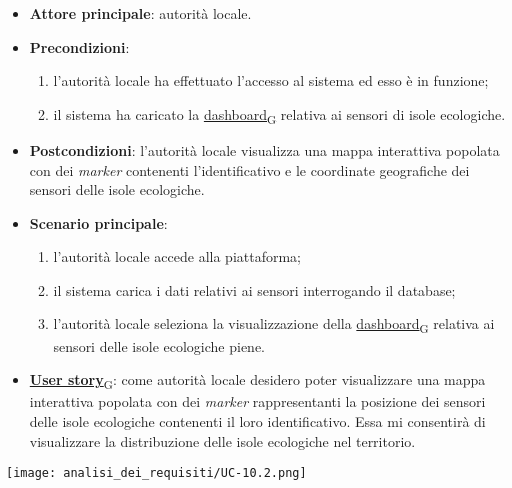 \begin{itemize}
	\item \textbf{Attore principale}: autorità locale.
	\item \textbf{Precondizioni}:
	      \begin{enumerate}
		      \item l'autorità locale ha effettuato l'accesso al sistema ed esso è in funzione;
		      \item il sistema ha caricato la \href{https://7last.github.io/docs/pb/documentazione-interna/glossario\#dashboard}{dashboard\textsubscript{G}} relativa ai sensori di isole ecologiche.
	      \end{enumerate}
	\item \textbf{Postcondizioni}: l'autorità locale visualizza una mappa interattiva popolata con dei \textit{marker} contenenti l'identificativo e le coordinate geografiche dei sensori delle isole ecologiche.
	\item \textbf{Scenario principale}:
	      \begin{enumerate}
		      \item l'autorità locale accede alla piattaforma;
		      \item il sistema carica i dati relativi ai sensori interrogando il database;
		      \item l'autorità locale seleziona la visualizzazione della \href{https://7last.github.io/docs/pb/documentazione-interna/glossario\#dashboard}{dashboard\textsubscript{G}} relativa ai sensori delle isole ecologiche piene.
	      \end{enumerate}
	\item \href{https://7last.github.io/docs/pb/documentazione-interna/glossario\#user-story}{\textbf{User story}\textsubscript{G}}:
	      come autorità locale desidero poter visualizzare una mappa interattiva popolata con dei \textit{marker} rappresentanti la posizione dei sensori delle isole ecologiche
	      contenenti il loro identificativo. Essa mi consentirà di visualizzare la distribuzione delle isole ecologiche nel territorio.
\end{itemize}
\begin{center}
	\texttt{[image: analisi\_dei\_requisiti/UC-10.2.png]}
\end{center}


